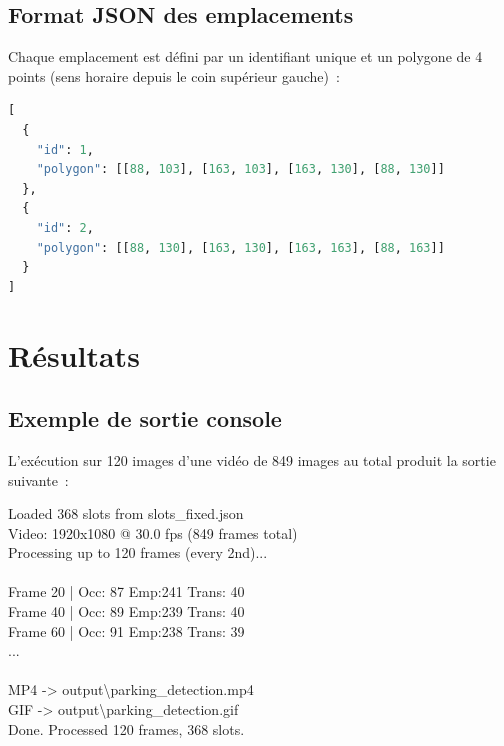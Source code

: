 \documentclass[12pt,a4paper]{report}
\begin{document}
\section{Format JSON des emplacements}

Chaque emplacement est défini par un identifiant unique et un polygone de 4 points (sens horaire depuis le coin supérieur gauche)~:

\begin{lstlisting}[language=Python, numbers=none, caption={Exemple de fichier slots.json}]
[
  {
    "id": 1,
    "polygon": [[88, 103], [163, 103], [163, 130], [88, 130]]
  },
  {
    "id": 2,
    "polygon": [[88, 130], [163, 130], [163, 163], [88, 163]]
  }
]
\end{lstlisting}

\chapter{Résultats}

\section{Exemple de sortie console}

L'exécution sur 120 images d'une vidéo de 849 images au total produit la sortie suivante~:

\begin{tcolorbox}[colback=black!90, coltext=green!70, fontupper=\ttfamily\small,
                  title={Sortie console}, colframe=gray!40, fonttitle=\bfseries\color{white}]
Loaded 368 slots from slots\_fixed.json\\
Video: 1920x1080 @ 30.0 fps  (849 frames total)\\
Processing up to 120 frames (every 2nd)...\\
~\\
  Frame   20 | Occ: 87  Emp:241  Trans: 40\\
  Frame   40 | Occ: 89  Emp:239  Trans: 40\\
  Frame   60 | Occ: 91  Emp:238  Trans: 39\\
  ...\\
~\\
MP4 -> output\textbackslash parking\_detection.mp4\\
GIF -> output\textbackslash parking\_detection.gif\\
Done. Processed 120 frames, 368 slots.
\end{tcolorbox}
\end{document}
